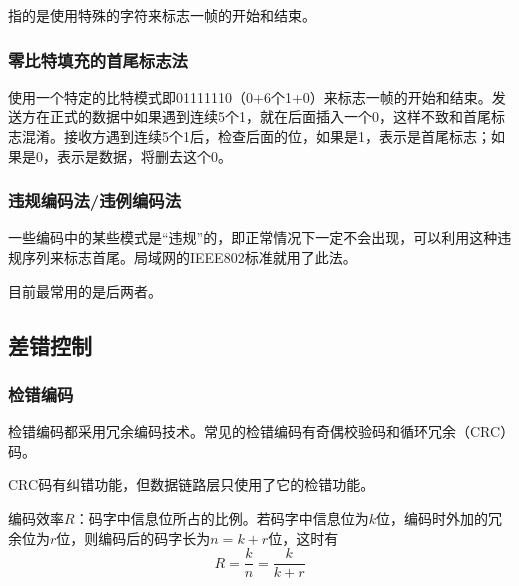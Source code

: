 \documentclass[12pt, a4paper, oneside]{ctexart}
\begin{document}
指的是使用特殊的字符来标志一帧的开始和结束。

\subsubsection{零比特填充的首尾标志法}

使用一个特定的比特模式即01111110（0+6个1+0）来标志一帧的开始和结束。发送方在正式的数据中如果遇到连续5个1，就在后面插入一个0，这样不致和首尾标志混淆。接收方遇到连续5个1后，检查后面的位，如果是1，表示是首尾标志；如果是0，表示是数据，将删去这个0。

\subsubsection{违规编码法/违例编码法}

一些编码中的某些模式是“违规”的，即正常情况下一定不会出现，可以利用这种违规序列来标志首尾。局域网的IEEE802标准就用了此法。

目前最常用的是后两者。

\subsection{差错控制}

\subsubsection{检错编码}

检错编码都采用冗余编码技术。常见的检错编码有奇偶校验码和循环冗余（CRC）码。

CRC码有纠错功能，但数据链路层只使用了它的检错功能。

编码效率$R$：码字中信息位所占的比例。若码字中信息位为$k$位，编码时外加的冗余位为$r$位，则编码后的码字长为$n=k+r$位，这时有
\begin{equation*}
    R=\frac{k}{n}=\frac{k}{k+r}
\end{equation*}
\end{document}
